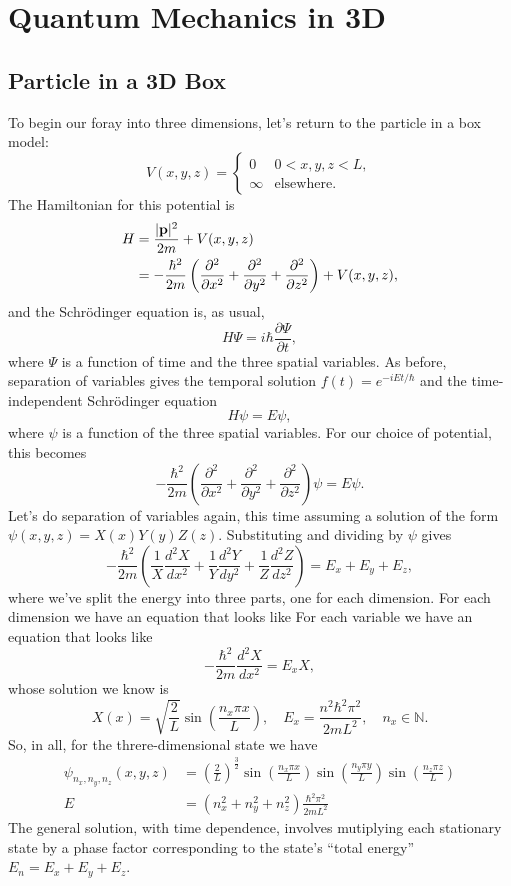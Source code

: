 \documentclass[../p052main.tex]{subfiles}
\begin{document}
\chapter{Quantum Mechanics in 3D}
\section{Particle in a 3D Box}
To begin our foray into three dimensions, let's return to the particle in a box model:
\[ V(x,y,z) = \begin{cases} 0 & 0 < x,y,z < L, \\ \infty & \text{elsewhere}. \end{cases} \]
The Hamiltonian for this potential is   
\begin{align*}
    H &= \frac{|\mathbf{p}|^2}{2m} + V(x,y,z) \\
    &= -\frac{\hbar^2}{2m} \left( \frac{\partial^2}{\partial x^2} + \frac{\partial^2}{\partial y^2} + \frac{\partial^2}{\partial z^2} \right) + V(x,y,z),
\end{align*}
and the Schrödinger equation is, as usual,
\[ H \Psi = i \hbar \frac{\partial \Psi}{\partial t}, \]
where $\Psi$ is a function of time and the three spatial variables.
As before, separation of variables gives the temporal solution $f(t) = e^{-iEt / \hbar}$ and the time-independent Schrödinger equation
\[ H \psi = E \psi, \]
where $\psi$ is a function of the three spatial variables.
For our choice of potential, this becomes
\[ -\frac{\hbar^2}{2m} \left( \frac{\partial^2}{\partial x^2} + \frac{\partial^2}{\partial y^2} + \frac{\partial^2}{\partial z^2} \right) \psi = E \psi. \]
Let's do separation of variables again, this time assuming a solution of the form $\psi(x,y,z) = X(x) Y(y) Z(z)$.
Substituting and dividing by $\psi$ gives
\[ -\frac{\hbar^2}{2m} \left( \frac{1}{X} \frac{d^2 X}{d x^2} + \frac{1}{Y} \frac{d^2 Y}{d y^2} + \frac{1}{Z} \frac{d^2 Z}{d z^2} \right) = E_x + E_y + E_z, \]
where we've split the energy into three parts, one for each dimension.
For each dimension we have an equation that looks like
For each variable we have an equation that looks like
\[ -\frac{\hbar^2}{2m} \frac{d^2 X}{d x^2} = E_x X, \]
whose solution we know is
\[ X(x) = \sqrt{\frac{2}{L}} \sin \left( \frac{n_x \pi x}{L} \right), \quad E_x = \frac{n^2 \hbar^2 \pi^2}{2mL^2}, \quad n_x \in \mathbb{N}. \]
So, in all, for the threre-dimensional state we have
\begin{align*}
    \psi_{n_x, n_y, n_z}(x,y,z) &= \left( \frac{2}{L} \right)^{\frac{3}{2}} \sin \left( \frac{n_x \pi x}{L} \right) \sin \left( \frac{n_y \pi y}{L} \right) \sin \left( \frac{n_z \pi z}{L} \right) \\
    E &= \left( n_x^2 + n_y^2 + n_z^2 \right) \frac{\hbar^2 \pi^2}{2mL^2}
\end{align*}
The general solution, with time dependence, involves mutiplying each stationary state by a phase factor corresponding to the state's ``total energy'' $E_n = E_x + E_y + E_z$.
\end{document}
